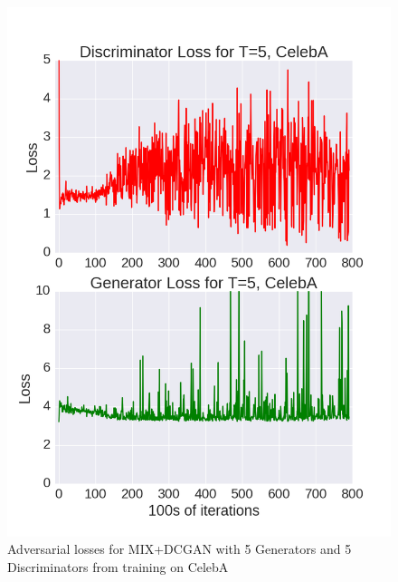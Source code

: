 \documentclass{article}
\begin{document}
\begin{figure}[!htb]%
  \centering
  \includegraphics[width=.85\linewidth]{figures/Loss_Graph_CelebA_T=5.png}
  \caption[Figure 2]{Adversarial losses for MIX+DCGAN with 5 Generators and 5 Discriminators from training on CelebA}
  \label{fig2}
\end{figure}
\end{document}
